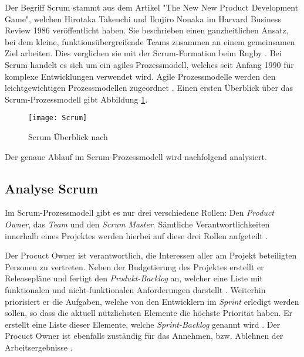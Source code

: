 Der Begriff Scrum stammt aus dem Artikel "The New New Product Development Game", welchen Hirotaka Takeuchi und Ikujiro Nonaka im Harvard Business Review 1986 veröffentlicht haben. Sie beschrieben einen ganzheitlichen Ansatz, bei dem kleine, funktionsübergreifende Teams zusammen an einem gemeinsamen Ziel arbeiten. Dies verglichen sie mit der Scrum-Formation beim Rugby \cite{Pham2012,Takeuchi1986}. \newline
Bei Scrum handelt es sich um ein agiles Prozessmodell, welches seit Anfang 1990 für komplexe Entwicklungen verwendet wird. Agile Prozessmodelle werden den leichtgewichtigen Prozessmodellen zugeordnet \cite{Hanser2010, Lacey2012}. Einen ersten Überblick über das Scrum-Prozessmodell gibt Abbildung \ref{fig:Scrum}.
\begin{figure}[htp]
\begin{center}
  \texttt{[image: Scrum]} %
  \caption{Scrum Überblick nach \cite{scrum2008}}
  \label{fig:Scrum}
\end{center}
\end{figure}
Der genaue Ablauf im Scrum-Prozessmodell wird nachfolgend analysiert.

\subsection{Analyse Scrum}


Im Scrum-Prozessmodell gibt es nur drei verschiedene Rollen: Den \textit{Product Owner}, das \textit{Team} und den \textit{Scrum Master}. Sämtliche Verantwortlichkeiten innerhalb eines Projektes werden hierbei auf diese drei Rollen aufgeteilt \cite{Schwaber2004}. \newline

Der Procuct Owner ist verantwortlich, die Interessen aller am Projekt beteiligten Personen zu vertreten. Neben der Budgetierung des Projektes erstellt er  Releasepläne und fertigt den \textit{Produkt-Backlog} an, welcher eine Liste mit funktionalen und nicht-funktionalen Anforderungen darstellt \cite{Schwaber2004, Pichler2010,Schwaber2007}. Weiterhin priorisiert er die Aufgaben, welche von den Entwicklern im \textit{Sprint} erledigt werden sollen, so dass die aktuell nützlichsten Elemente die höchste Priorität haben. Er erstellt eine Liste dieser Elemente, welche \textit{Sprint-Backlog} genannt wird \cite{Henning2011, Schwaber2007,Pichler2010}. Der Procuct Owner ist ebenfalls zuständig für das Annehmen, bzw. Ablehnen der Arbeitsergebnisse \cite{eclipseScrum}. \newline

